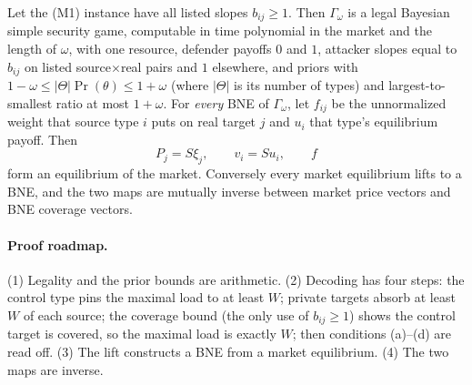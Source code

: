\begin{theorem}\label{thm:mk-embed}
\statusrefereed
Let the (M1) instance have all listed slopes $b_{ij}\ge1$. Then $\Gamma_\omega$ is a legal Bayesian
simple security game, computable in time polynomial in the market and the length of $\omega$, with
one resource, defender payoffs $0$ and $1$, attacker slopes equal to $b_{ij}$ on listed source$\times$real
pairs and $1$ elsewhere, and priors with $1-\omega\le|\Theta|\Pr(\theta)\le1+\omega$ (where $|\Theta|$ is its number of types) and
largest-to-smallest ratio at most $1+\omega$. For \emph{every} BNE of $\Gamma_\omega$, let $f_{ij}$
be the unnormalized weight that source type $i$ puts on real target $j$ and $u_i$ that type's
equilibrium payoff. Then
\[
P_j=S\xi_j,\qquad v_i=Su_i,\qquad f
\]
form an equilibrium of the market. Conversely every market equilibrium lifts to a BNE, and the two maps
are mutually inverse between market price vectors and BNE coverage vectors.
\end{theorem}

\paragraph{Proof roadmap.} (1) Legality and the prior bounds are arithmetic. (2) Decoding has four steps:
the control type pins the maximal load to at least $W$; private targets absorb at least $W$ of each
source; the coverage bound (the only use of $b_{ij}\ge1$) shows the control target is covered, so the
maximal load is exactly $W$; then conditions (a)--(d) are read off. (3) The lift constructs a BNE from a
market equilibrium. (4) The two maps are inverse.

